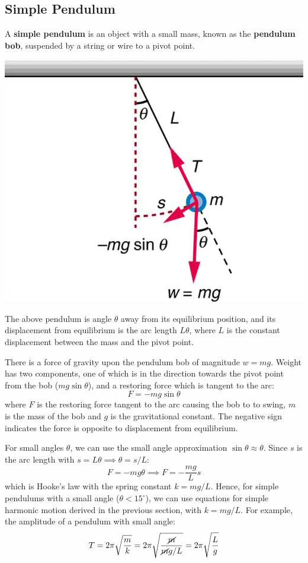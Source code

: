 \documentclass{article}
\newcommand{\definition}[1]{\begin{tcolorbox}[colback=red!5!white,colframe=red!75!black,parbox=false] #1 \end{tcolorbox}}
\begin{document}
\subsection{Simple Pendulum}

\definition{A \textbf{simple pendulum} is an object with a small mass, known as the \textbf{pendulum bob}, suspended by a string or wire to a pivot point.}

\begin{center}
	\includegraphics[width=0.5\linewidth]{pendulum.png}
\end{center}

The above pendulum is angle $\theta$ away from its equilibrium position, and its displacement from equilibrium is the arc length $L\theta$, where $L$ is the constant displacement between the mass and the pivot point.

There is a force of gravity upon the pendulum bob of magnitude $w=mg$. Weight has two components, one of which is in the direction towards the pivot point from the bob ($mg\sin\theta$), and a restoring force which is tangent to the arc:
\begin{equation*}
    F=-mg \sin\theta
\end{equation*}
where $F$ is the restoring force tangent to the arc causing the bob to to swing, $m$ is the mass of the bob and $g$ is the gravitational constant. The negative sign indicates the force is opposite to displacement from equilibrium.

For small angles $\theta$, we can use the small angle approximation $\sin\theta\approx\theta$. Since $s$ is the arc length with $s=L\theta\implies \theta=s/L$:
\begin{equation*}
    F=-mg\theta
	\implies F=-\frac{mg}{L}s
\end{equation*}
which is Hooke's law with the spring constant $k=mg/L$. Hence, for simple pendulums with a small angle ($\theta<15^\circ$), we can use equations for simple harmonic motion derived in the previous section, with $k=mg/L$. For example, the amplitude of a pendulum with small angle:
\begin{equation*}
    T
	=2\pi \sqrt{\frac mk}
	=2\pi \sqrt{\frac{\cancel{m}}{\cancel{m}g/L}}
	=2\pi \sqrt{\frac Lg}
\end{equation*}
\end{document}
